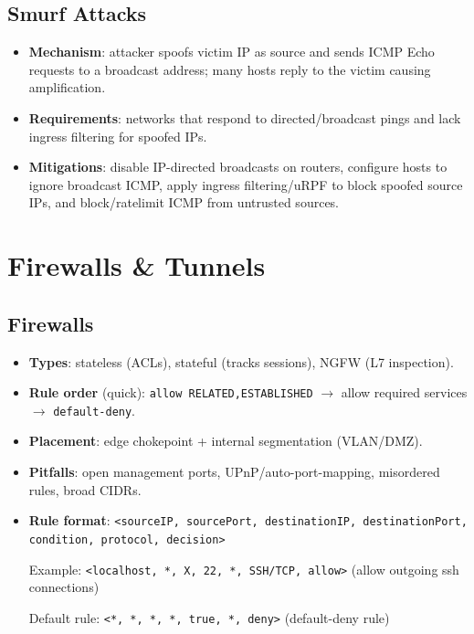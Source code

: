 \documentclass[11pt]{article}
\begin{document}
\subsection{Smurf Attacks}
\begin{itemize}
  \item \textbf{Mechanism}: attacker spoofs victim IP as source and sends ICMP Echo requests to a broadcast address; many hosts reply to the victim causing amplification.
  
  \item \textbf{Requirements}: networks that respond to directed/broadcast pings and lack ingress filtering for spoofed IPs.
  
  \item \textbf{Mitigations}: disable IP-directed broadcasts on routers, configure hosts to ignore broadcast ICMP, apply ingress filtering/uRPF to block spoofed source IPs, and block/ratelimit ICMP from untrusted sources.
\end{itemize}

\section{Firewalls \& Tunnels}

\subsection{Firewalls}
\begin{itemize}
  \item \textbf{Types}: stateless (ACLs), stateful (tracks sessions), NGFW (L7 inspection).
  
  \item \textbf{Rule order} (quick): \texttt{allow RELATED,ESTABLISHED} $\rightarrow$ allow required services $\rightarrow$ \texttt{default-deny}.
  
  \item \textbf{Placement}: edge chokepoint + internal segmentation (VLAN/DMZ).
  
  \item \textbf{Pitfalls}: open management ports, UPnP/auto-port-mapping, misordered rules, broad CIDRs.
  
  \item \textbf{Rule format}: \texttt{<sourceIP, sourcePort, destinationIP, destinationPort, condition, protocol, decision>}
  
  Example: \texttt{<localhost, *, X, 22, *, SSH/TCP, allow>} (allow outgoing ssh connections)
  
  Default rule: \texttt{<*, *, *, *, true, *, deny>} (default-deny rule)
\end{itemize}
\end{document}
